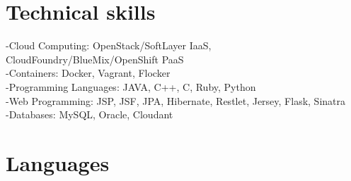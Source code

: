 \documentclass[11pt,a4paper,sans]{moderncv}   %
\begin{document}
\section{Technical skills}
-Cloud Computing: OpenStack/SoftLayer IaaS, CloudFoundry/BlueMix/OpenShift PaaS \\
-Containers: Docker, Vagrant, Flocker \\
-Programming Languages: JAVA, C++, C, Ruby, Python \\
-Web Programming: JSP, JSF, JPA, Hibernate, Restlet, Jersey, Flask, Sinatra \\
-Databases: MySQL, Oracle, Cloudant
\section{Languages}



\end{document}
